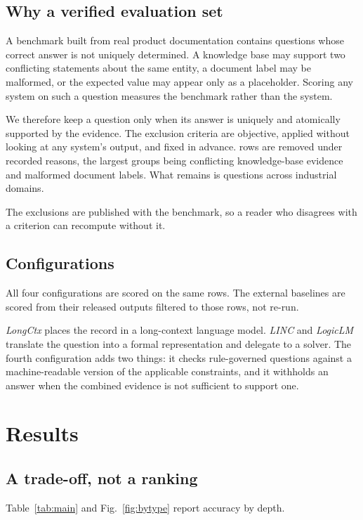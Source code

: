 \documentclass[conference]{IEEEtran}
\begin{document}
\subsection{Why a verified evaluation set}
A benchmark built from real product documentation contains questions whose
correct answer is not uniquely determined. A knowledge base may support two
conflicting statements about the same entity, a document label may be malformed,
or the expected value may appear only as a placeholder. Scoring any system on
such a question measures the benchmark rather than the system.

We therefore keep a question only when its answer is uniquely and atomically
supported by the evidence. The exclusion criteria are objective, applied without
looking at any system's output, and fixed in advance. \ExcludedRows{} rows are
removed under \ExcludedReasons{} recorded reasons, the largest groups being
conflicting knowledge-base evidence and malformed document labels. What remains
is \VerifiedN{} questions across \VerifiedDomains{} industrial domains.

The exclusions are published with the benchmark, so a reader who disagrees with
a criterion can recompute without it.

\subsection{Configurations}
All four configurations are scored on the same \VerifiedN{} rows. The external
baselines are scored from their released outputs filtered to those rows, not
re-run.

\emph{LongCtx} places the record in a long-context language model.
\emph{LINC} and \emph{LogicLM} translate the question into a formal
representation and delegate to a solver. The fourth configuration adds two
things: it checks rule-governed questions against a machine-readable version of
the applicable constraints, and it withholds an answer when the combined
evidence is not sufficient to support one.

\section{Results}
\subsection{A trade-off, not a ranking}
Table~\ref{tab:main} and Fig.~\ref{fig:bytype} report accuracy by depth.
\end{document}
